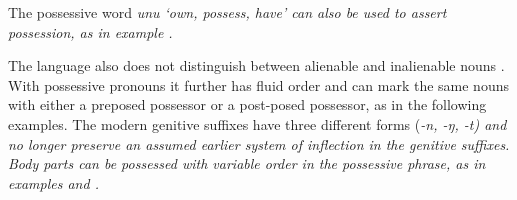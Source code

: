 \begin{exe}
	\label{ex:02-15}
	\label{ex:02-16}
	\label{ex:02-17}
\end{exe}

The  possessive word \it{unu} ‘own,
possess, have’ can also be used to assert possession,
as in example .

\begin{exe}
	\label{ex:02-18}
\end{exe}

The  language  also does not distinguish
between alienable and inalienable nouns \citep[607--608]{LewisGrimes1995}.
With possessive pronouns it further has fluid order
and can mark the same nouns with either a preposed possessor
or a post-posed possessor,
as in the following examples.
The modern genitive suffixes have three different forms
(\it{-n, -ŋ, -t}) and no longer preserve an assumed earlier system of
inflection in the genitive suffixes.
Body parts can be possessed with variable order in the possessive
phrase, as in examples  and .

\begin{exe}
	\label{ex:02-19}
	\label{ex:02-20}
\end{exe}

